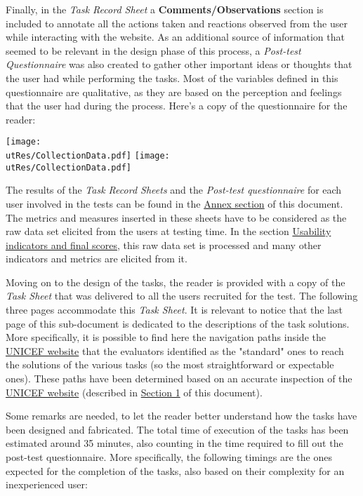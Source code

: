 Finally, in the \textit{Task Record Sheet} a \textbf{Comments/Observations} section is included to annotate all the actions taken and reactions observed from the user while interacting with the website.
As an additional source of information that seemed to be relevant in the design phase of this process, a \textit{Post-test Questionnaire} was also created to gather other important ideas or thoughts that the user had while performing the tasks. Most of the variables defined in this questionnaire are qualitative, as they are based on the perception and feelings that the user had during the process.
Here's a copy of the questionnaire for the reader:

\begin{center}
	\texttt{[image: \\utRes/CollectionData.pdf]}
	\texttt{[image: \\utRes/CollectionData.pdf]}
\end{center}

The results of the \textit{Task Record Sheets} and the \textit{Post-test questionnaire} for each user involved in the tests can be found in the \hyperref[sec:annex]{Annex section} of this document.\\
The metrics and measures inserted in these sheets have to be considered as the raw data set elicited from the users at testing time. In the section \hyperref[subsec:resultsUT]{Usability indicators and final scores}, this raw data set is processed and many other indicators and metrics are elicited from it.
 
 
 
Moving on to the design of the tasks, the reader is provided with a copy of the \textit{Task Sheet} that was delivered to all the users recruited for the test. The following three pages accommodate this \textit{Task Sheet}. It is relevant to notice that the last page of this sub-document is dedicated to the descriptions of the task solutions. More specifically, it is possible to find here the navigation paths inside the \href{https://www.unicef.org/}{UNICEF website} that the evaluators identified as the "standard" ones to reach the solutions of the various tasks (so the most straightforward or expectable ones). These paths have been determined based on an accurate inspection of the \href{https://www.unicef.org/}{UNICEF website} (described in \hyperref[sec:inspection]{Section 1} of this document). 


	
Some remarks are needed, to let the reader better understand how the tasks have been designed and fabricated. 
The total time of execution of the tasks has been estimated around 35 minutes, also counting in the time required to fill out the post-test questionnaire. More specifically, the following timings are the ones expected for the completion of the tasks, also based on their complexity for an inexperienced user:

